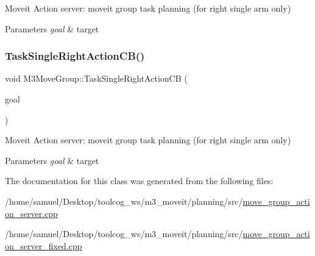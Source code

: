 Moveit Action server\+: moveit group task planning (for right single arm only) 


\begin{DoxyParams}{Parameters}
{\em goal} & target \\
\hline
\end{DoxyParams}
\mbox{\label{classM3MoveGroup_aee17065b5aa40384dcca5a6589261ded}} 
\subsubsection{\texorpdfstring{Task\+Single\+Right\+Action\+C\+B()}{TaskSingleRightActionCB()}\hspace{0.1cm}{\footnotesize\ttfamily [2/2]}}
{\footnotesize\ttfamily void M3\+Move\+Group\+::\+Task\+Single\+Right\+Action\+CB (\begin{DoxyParamCaption}\item[{const m3\+\_\+moveit\+::\+Moveit\+Single\+Goal\+Const\+Ptr \&}]{goal }\end{DoxyParamCaption})\hspace{0.3cm}{\ttfamily [inline]}}



Moveit Action server\+: moveit group task planning (for right single arm only) 


\begin{DoxyParams}{Parameters}
{\em goal} & target \\
\hline
\end{DoxyParams}


The documentation for this class was generated from the following files\+:\begin{DoxyCompactItemize}
\item 
/home/samuel/\+Desktop/toolcog\+\_\+ws/m3\+\_\+moveit/planning/src/\hyperlink{move__group__action__server_8cpp}{move\+\_\+group\+\_\+action\+\_\+server.\+cpp}\item 
/home/samuel/\+Desktop/toolcog\+\_\+ws/m3\+\_\+moveit/planning/src/\hyperlink{move__group__action__server__fixed_8cpp}{move\+\_\+group\+\_\+action\+\_\+server\+\_\+fixed.\+cpp}\end{DoxyCompactItemize}
